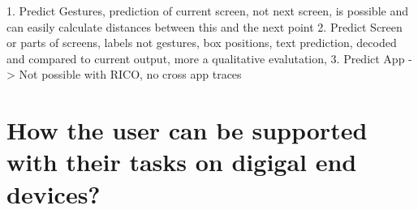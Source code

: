 1. Predict Gestures, prediction of current screen, not next screen, is possible and can easily calculate distances between this and the next point
2. Predict Screen or parts of screens, labels not gestures, box positions, text prediction, decoded and compared to current output, more a qualitative evalutation,
3. Predict App -> Not possible with RICO, no cross app traces

\section{How the user can be supported with their tasks on digigal end devices?}
